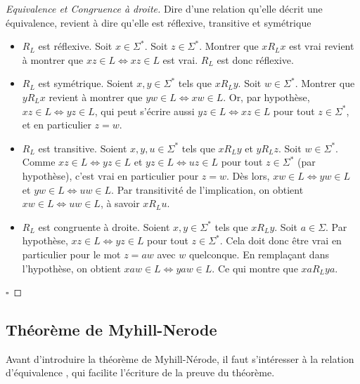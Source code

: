 \begin{proof}[Equivalence et Congruence à droite]
	Dire d'une relation qu'elle décrit une équivalence, revient à dire qu'elle est réflexive, transitive et symétrique
\begin{itemize}
		\item $R_L$ est réflexive. Soit $x \in \Sigma^*$. Soit $z \in \Sigma^*$. Montrer que $xR_Lx$ est vrai revient à montrer que $ xz \in L \Leftrightarrow xz \in L$ est vrai. $R_L$ est donc réflexive.
		\item $R_L$ est symétrique. Soient $x, y \in \Sigma^*$ tels que $xR_Ly$. Soit $w \in \Sigma^*$. Montrer que $yR_Lx$ revient à montrer que $ yw \in L \Leftrightarrow xw \in L$. Or, par hypothèse, $ xz \in L \Leftrightarrow yz \in L$, qui peut s'écrire aussi $ yz \in L \Leftrightarrow xz \in L$ pour tout $z \in \Sigma^*$, et en particulier $z=w$.
		\item $R_L$ est transitive. Soient $x,y,u \in \Sigma^*$ tels que $xR_Ly$ et $yR_Lz$. Soit $w \in \Sigma^*$. Comme $ xz \in L \Leftrightarrow yz \in L$ et $ yz \in L \Leftrightarrow uz \in L$ pour tout $z \in \Sigma^*$ (par hypothèse), c'est vrai en particulier pour $z=w$. Dès lors,  $ xw \in L \Leftrightarrow yw \in L$ et $ yw \in L \Leftrightarrow uw \in L$. Par transitivité de l'implication, on obtient $ xw \in L \Leftrightarrow uw \in L$, à savoir $xR_Lu$.
		\item $R_L$ est congruente à droite. Soient $x,y \in \Sigma^*$ tels que $xR_Ly$. Soit $a \in \Sigma$. Par hypothèse, $ xz \in L \Leftrightarrow yz \in L$ pour tout $z \in \Sigma^*$. Cela doit donc être vrai en particulier pour le mot $z=aw$ avec $w$ quelconque. En remplaçant dans l'hypothèse, on obtient  $ xaw \in L \Leftrightarrow yaw \in L$. Ce qui montre que $xaR_Lya$.
	\end{itemize}

\hfill$\square$
\end{proof}


\subsection{Théorème de Myhill-Nerode}

	Avant d'introduire la théorème de Myhill-Nérode, il faut s'intéresser à la relation d'équivalence \rb, qui facilite l'écriture de la preuve du théorème.

